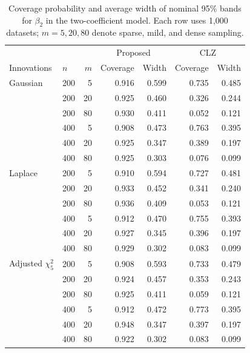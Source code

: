 \begin{table}[!tbp]
\centering
\caption{Coverage probability and average width of nominal 95\% bands for $\beta_2$ in the two-coefficient model. Each row uses 1,000 datasets; $m=5,20,80$ denote sparse, mild, and dense sampling.}
\label{tab:single-new}
\renewcommand{\baselinestretch}{1.2}\small
\begin{tabular}{llrrrrr}
\toprule
& & & \multicolumn{2}{c}{Proposed} & \multicolumn{2}{c}{CLZ}\\
Innovations & $n$ & $m$ & Coverage & Width & Coverage & Width\\
\midrule
Gaussian & 200 & 5 & 0.916 & 0.599 & 0.735 & 0.485\\
 & 200 & 20 & 0.925 & 0.460 & 0.326 & 0.244\\
 & 200 & 80 & 0.930 & 0.411 & 0.052 & 0.121\\
 & 400 & 5 & 0.908 & 0.473 & 0.763 & 0.395\\
 & 400 & 20 & 0.925 & 0.347 & 0.389 & 0.197\\
 & 400 & 80 & 0.925 & 0.303 & 0.076 & 0.099\\
\midrule
Laplace & 200 & 5 & 0.910 & 0.594 & 0.727 & 0.481\\
 & 200 & 20 & 0.933 & 0.452 & 0.341 & 0.240\\
 & 200 & 80 & 0.936 & 0.409 & 0.053 & 0.121\\
 & 400 & 5 & 0.912 & 0.470 & 0.755 & 0.393\\
 & 400 & 20 & 0.927 & 0.345 & 0.396 & 0.197\\
 & 400 & 80 & 0.929 & 0.302 & 0.083 & 0.099\\
\midrule
Adjusted $\chi^2_5$ & 200 & 5 & 0.908 & 0.593 & 0.733 & 0.479\\
 & 200 & 20 & 0.924 & 0.457 & 0.353 & 0.243\\
 & 200 & 80 & 0.925 & 0.411 & 0.059 & 0.121\\
 & 400 & 5 & 0.912 & 0.472 & 0.773 & 0.395\\
 & 400 & 20 & 0.948 & 0.347 & 0.397 & 0.197\\
 & 400 & 80 & 0.922 & 0.302 & 0.083 & 0.099\\
\bottomrule
\end{tabular}
\end{table}
